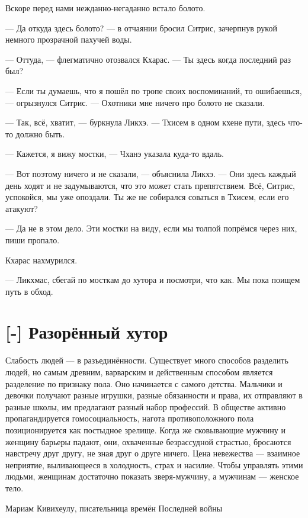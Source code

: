 Вскоре перед нами нежданно-негаданно встало болото.

--- Да откуда здесь болото? --- в отчаянии бросил Ситрис, зачерпнув рукой немного прозрачной пахучей воды.

--- Оттуда, --- флегматично отозвался Кхарас.
--- Ты здесь когда последний раз был?

--- Если ты думаешь, что я пошёл по тропе своих воспоминаний, то ошибаешься, --- огрызнулся Ситрис.
--- Охотники мне ничего про болото не сказали.

--- Так, всё, хватит, --- буркнула Ликхэ.
--- Тхисем в одном кхене пути, здесь что-то должно быть.

--- Кажется, я вижу мостки, --- Чханэ указала куда-то вдаль.

--- Вот поэтому ничего и не сказали, --- объяснила Ликхэ.
--- Они здесь каждый день ходят и не задумываются, что это может стать препятствием.
Всё, Ситрис, успокойся, мы уже опоздали.
Ты же не собирался соваться в Тхисем, если его атакуют?

--- Да не в этом дело.
Эти мостки на виду, если мы толпой попрёмся через них, пиши пропало.

Кхарас нахмурился.

--- Ликхмас, сбегай по мосткам до хутора и посмотри, что как.
Мы пока поищем путь в обход.

\textspace

\section{[-] Разорённый хутор}

\epigraph
{Слабость людей --- в разъединённости.
Существует много способов разделить людей, но самым древним, варварским и действенным способом является разделение по признаку пола.
Оно начинается с самого детства.
Мальчики и девочки получают разные игрушки, разные обязанности и права, их отправляют в разные школы, им предлагают разный набор профессий.
В обществе активно пропагандируется гомосоциальность, нагота противоположного пола позиционируется как постыдное зрелище.
Когда же сковывающие мужчину и женщину барьеры падают, они, охваченные безрассудной страстью, бросаются навстречу друг другу, не зная друг о друге ничего.
Цена невежества --- взаимное неприятие, выливающееся в холодность, страх и насилие.
Чтобы управлять этими людьми, женщинам достаточно показать зверя-мужчину, а мужчинам --- женское тело.}
{Мариам Кивихеулу, писательница времён Последней войны}

